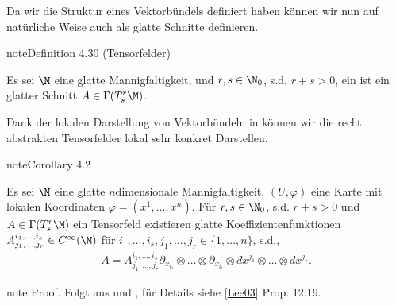\documentclass[letterpaper,10pt,german]{jupyterBook}
\begin{document}
\sphinxAtStartPar
Da wir die Struktur eines Vektorbündels definiert haben können wir nun auf natürliche Weise auch  als glatte Schnitte definieren.
\label{manifolds/tangential:definition-45}
\begin{sphinxadmonition}{note}{Definition 4.30 (Tensorfelder)}



\sphinxAtStartPar
Es sei \(\M\) eine glatte Mannigfaltigkeit, und \(r,s\in\N_0\), s.d. \(r+s>0\), ein  ist ein glatter Schnitt \(A\in \Gamma(T^r_s\M)\).
\end{sphinxadmonition}

\sphinxAtStartPar
Dank der lokalen Darstellung von Vektorbündeln in {\hyperref[\detokenize{manifolds/tangential:lem:localsections}]{}} können wir die recht abstrakten Tensorfelder lokal sehr konkret Darstellen.
\label{manifolds/tangential:cor:tensorfieldchart}
\begin{sphinxadmonition}{note}{Corollary 4.2}



\sphinxAtStartPar
Es sei \(\M\) eine glatte \(n\)\sphinxhyphen{}dimensionale Mannigfaltigkeit, \((U,\varphi)\) eine Karte mit lokalen Koordinaten \(\varphi=(x^1,\ldots,x^n)\). Für \(r,s\in\N_0\), s.d. \(r+s>0\) und \(A\in \Gamma(T^r_s\M)\) ein Tensorfeld existieren glatte Koeffizientenfunktionen \(A^{i_1,\ldots, i_s}_{j_1,\ldots,j_r}\in C^\infty(\M)\) für \(i_1,\ldots, i_s, j_1,\ldots, j_r\in \{1,\ldots,n\}\), s.d.,
\begin{equation*}
\begin{split}A = A^{i_1,\ldots,i_s}_{j_1,\ldots,j_r} \partial_{x_{i_1}}\otimes\ldots\otimes \partial_{x_{i_r}}\otimes dx^{j_1}\otimes\ldots\otimes dx^{j_s}.\end{split}
\end{equation*}\end{sphinxadmonition}

\begin{sphinxadmonition}{note}
\sphinxAtStartPar
Proof. Folgt aus {\hyperref[\detokenize{manifolds/tangential:lem:localsections}]{}} und {\hyperref[\detokenize{manifolds/tangential:lem:coordcovec}]{}},  für Details siehe {[}\hyperlink{cite.references:id18}{Lee03}{]} Prop. 12.19.
\end{sphinxadmonition}
\end{document}
